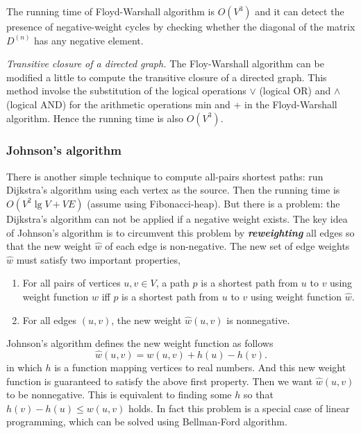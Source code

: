 \documentclass[12pt]{article}
\begin{document}
The running time of Floyd-Warshall algorithm is $O(V^3)$ and it can detect
the presence of negative-weight cycles by checking whether the diagonal of
the matrix $D^{(n)}$ has any negative element.

\emph{Transitive closure of a directed graph.}
    The Floy-Warshall algorithm can be modified a little to compute the
    transitive closure of a directed graph.  This method involse the
    substitution of the logical operations $\lor$ (logical OR) and $\land$
    (logical AND) for the arithmetic operations min and + in the Floyd-Warshall
    algorithm.  Hence the running time is also $O(V^3)$.

\subsubsection{Johnson's algorithm}

There is another simple technique to compute all-pairs shortest paths: run
Dijkstra's algorithm using each vertex as the source.  Then the running
time is $O(V^2\lg{V}+VE)$ (assume using Fibonacci-heap).  But there is a
problem: the Dijkstra's algorithm can not be applied if a negative weight
exists.  The key idea of Johnson's algorithm is to circumvent this problem
by {\bf\em reweighting} all edges so that the new weight $\widehat{w}$ of 
each edge is non-negative.  The new set of edge weights $\widehat{w}$ must
satisfy two important properties,
    \begin{enumerate}
        \item For all pairs of vertices $u,v \in V$, a path $p$ is a
        shortest path from $u$ to $v$ using weight function $w$ if\mbox{}f $p$ is
        a shortest path from $u$ to $v$ using weight function $\widehat{w}$.
        \item For all edges $(u,v)$, the new weight $\widehat{w}(u,v)$ is
        nonnegative.
    \end{enumerate}

Johnson's algorithm defines the new weight function as follows
\[ \widehat{w}(u,v) = w(u,v) + h(u) - h(v). \]
in which $h$ is a function mapping vertices to real numbers.
And this new weight function is guaranteed to satisfy the above first
property.  Then we want $\widehat{w}(u,v)$ to be nonnegative.  This is
equivalent to finding some $h$ so that $h(v)-h(u) \leq w(u,v)$ holds.  
In fact this problem is a special case of linear programming, which can be
solved using Bellman-Ford algorithm.
\end{document}
